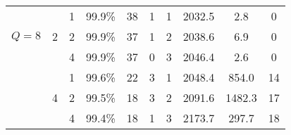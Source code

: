 \begin{table}[t]
{\begin{tabular}{c|c|c|c|c|c|c|c|c|c}
     &   & 1 & 99.9\% & 38 & 1 & 1 & 2032.5 & 2.8 & 0\\ \rowcolor{gray!20}
     \cellcolor{white} $Q=8$ & 2 & 2 & 99.9\% & 37 & 1 & 2 & 2038.6 & 6.9 & 0\\ 
     &   & 4 & 99.9\% & 37 & 0 & 3 & 2046.4 & 2.6 & 0\\ \cline{2-10}

     &   & 1 & 99.6\% & 22 & 3 & 1 & 2048.4 & 854.0 & 14 \\ \rowcolor{gray!20}
     \cellcolor{white} & 4 & 2 & 99.5\% & 18 & 3 & 2 & 2091.6 & 1482.3 & 17 \\ 
     &   & 4 & 99.4\% & 18 & 1 & 3 & 2173.7 & 297.7 & 18 \\
    
    \bottomrule
    \end{tabular}}\vspace{-2mm}
\end{table}







